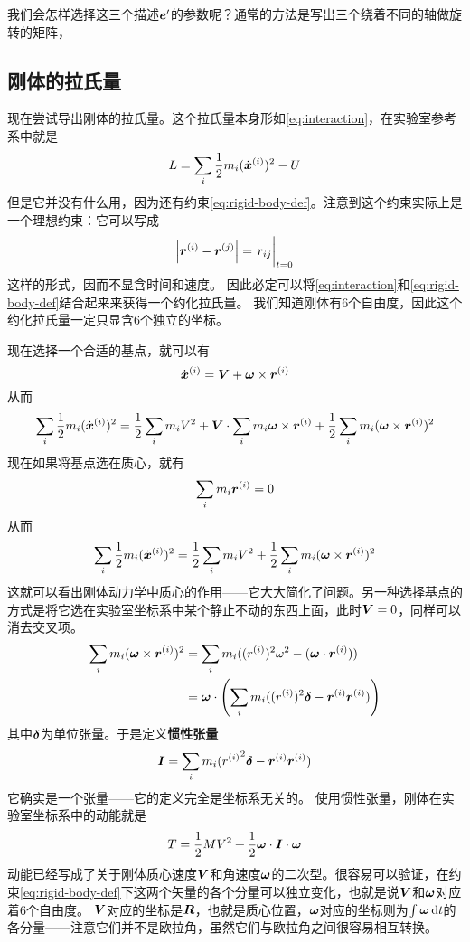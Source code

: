 \documentclass[UTF8, a4paper]{ctexart}
\renewcommand*{\dd}{\mathop{}\!\mathrm{d}}
\begin{document}
我们会怎样选择这三个描述$\vb*{e}'$的参数呢？通常的方法是写出三个绕着不同的轴做旋转的矩阵，

\subsection{刚体的拉氏量}

现在尝试导出刚体的拉氏量。这个拉氏量本身形如\eqref{eq:interaction}，在实验室参考系中就是
\[
    L = \sum_i \frac{1}{2} m_i (\dot{\vb*{x}}^{(i)})^2 - U
\]
但是它并没有什么用，因为还有约束\eqref{eq:rigid-body-def}。注意到这个约束实际上是一个理想约束：它可以写成
\[
    \abs{\vb*{r}^{(i)} - \vb*{r}^{(j)}} = \eval{r_{ij}}_{t=0}
\]
这样的形式，因而不显含时间和速度。
因此必定可以将\eqref{eq:interaction}和\eqref{eq:rigid-body-def}结合起来来获得一个约化拉氏量。
我们知道刚体有6个自由度，因此这个约化拉氏量一定只显含6个独立的坐标。

现在选择一个合适的基点，就可以有
\[
    \dot{\vb*{x}}^{(i)} = \vb*{V} + \vb*{\omega} \times \vb*{r}^{(i)}
\]
从而
\[
    \sum_i \frac{1}{2} m_i (\dot{\vb*{x}}^{(i)})^2 = 
    \frac{1}{2} \sum_i m_i V^2 + \vb*{V} \cdot \sum_i m_i \vb*{\omega} \times \vb*{r}^{(i)} 
    + \frac{1}{2} \sum_i m_i (\vb*{\omega} \times \vb*{r}^{(i)})^2
\]
现在如果将基点选在质心，就有
\[
    \sum_i m_i \vb*{r}^{(i)} = 0
\]
从而
\[
    \sum_i \frac{1}{2} m_i (\dot{\vb*{x}}^{(i)})^2 = \frac{1}{2} \sum_i m_i V^2 
    + \frac{1}{2} \sum_i m_i (\vb*{\omega} \times \vb*{r}^{(i)})^2
\]
这就可以看出刚体动力学中质心的作用——它大大简化了问题。另一种选择基点的方式是将它选在实验室坐标系中某个静止不动的东西上面，此时$\vb*{V}=0$，同样可以消去交叉项。
\[
    \begin{aligned}
        \sum_i m_i (\vb*{\omega} \times \vb*{r}^{(i)})^2 
        &= \sum_i m_i ((r^{(i)})^2 \omega^2 - (\vb*{\omega} \cdot \vb*{r}^{(i)})) \\
        &= \vb*{\omega} \cdot \left( \sum_i m_i ((r^{(i)})^2 \vb*{\delta} - \vb*{r}^{(i)} \vb*{r}^{(i)} ) \right)
    \end{aligned}
\]
其中$\vb*{\delta}$为单位张量。于是定义\textbf{惯性张量}
\begin{equation}
    \vb*{I} = \sum_i m_i {(r^{(i)}}^2 \vb*{\delta} - \vb*{r}^{(i)} \vb*{r}^{(i)} ) 
    \label{eq:ineria-tensor}
\end{equation}
它确实是一个张量——它的定义完全是坐标系无关的。
使用惯性张量，刚体在实验室坐标系中的动能就是
\begin{equation}
    T = \frac{1}{2} M V^2 + \frac{1}{2} \vb*{\omega} \cdot \vb*{I} \cdot \vb*{\omega}
    \label{eq:kinetic-energy-rigid-body}
\end{equation}
动能已经写成了关于刚体质心速度$\vb*{V}$和角速度$\vb*{\omega}$的二次型。很容易可以验证，在约束\eqref{eq:rigid-body-def}下这两个矢量的各个分量可以独立变化，也就是说$\vb*{V}$和$\vb*{\omega}$对应着6个自由度。
$\vb*{V}$对应的坐标是$\vb*{R}$，也就是质心位置，$\vb*{\omega}$对应的坐标则为$\int \vb*{\omega} \dd t$的各分量——注意它们并不是欧拉角，虽然它们与欧拉角之间很容易相互转换。
\end{document}
